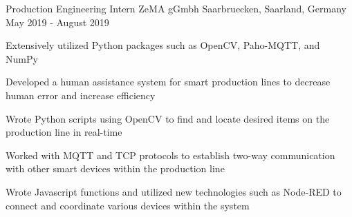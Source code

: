 \begin{cventries}
  \cventry
    {Production Engineering Intern} %
    {ZeMA gGmbh} %
    {Saarbruecken, Saarland, Germany} %
    { May 2019 - August 2019} %
    {
      \begin{cvitems} %
      \item Extensively utilized Python packages such as OpenCV, Paho-MQTT, and NumPy
      \item Developed a human assistance system for smart production lines to decrease human error and increase efficiency
      \item Wrote Python scripts using OpenCV to find and locate desired items on the production line in real-time
      \item Worked with MQTT and TCP protocols to establish two-way communication with other smart devices within the production line
      \item Wrote Javascript functions and utilized new technologies such as Node-RED to connect and coordinate various devices within the system
      \end{cvitems}
    }

\end{cventries}
